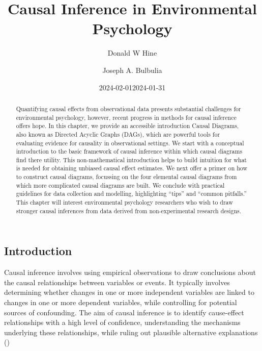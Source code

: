 \documentclass[
  singlecolumn]{article}
\title{Causal Inference in Environmental Psychology}
\author{Donald W Hine \and Joseph A. Bulbulia}
\date{2024-02-01}
\date{2024-01-31}
\begin{document}
\maketitle
\begin{abstract}
Quantifying causal effects from observational data presents substantial
challenges for environmental psychology, however, recent progress in
methods for causal inference offers hope. In this chapter, we provide an
accessible introduction Causal Diagrams, also known as Directed Acyclic
Graphs (DAGs), which are powerful tools for evaluating evidence for
causality in observational settings. We start with a conceptual
introduction to the basic framework of causal inference within which
causal diagrams find there utility. This non-mathematical introduction
helps to build intuition for what is needed for obtaining unbiased
causal effect estimates. We next offer a primer on how to construct
causal diagrams, focussing on the four elemental causal diagrams from
which more complicated causal diagrams are built. We conclude with
practical guidelines for data collection and modelling, highlighting
``tips'' and ``common pitfalls.'' This chapter will interest
environmental psychology researchers who wish to draw stronger causal
inferences from data derived from non-experimental research designs.
\end{abstract}

\subsection{Introduction}\label{introduction}

Causal inference involves using empirical observations to draw
conclusions about the causal relationships between variables or events.
It typically involves determining whether changes in one or more
independent variables are linked to changes in one or more dependent
variables, while controlling for potential sources of confounding. The
aim of causal inference is to identify cause-effect relationships with a
high level of confidence, understanding the mechanisms underlying these
relationships, while ruling out plausible alternative explanations
()
\end{document}

